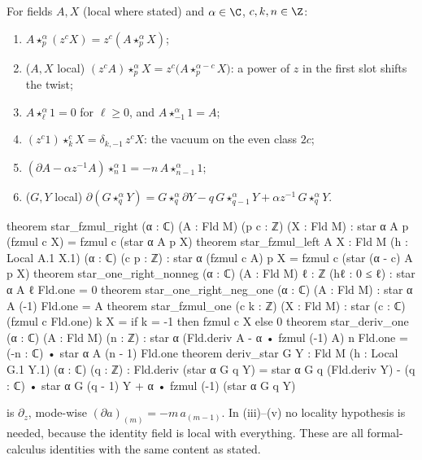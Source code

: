 \begin{proposition}\label{ch07:prop:staraux}
For fields $A, X$ (local where stated) and $\alpha\in\C$, $c,k,n\in\Z$:
\begin{enumerate}[label=(\roman*)]
  \item $A\star^\alpha_p(z^cX) = z^c(A\star^\alpha_pX)$;
  \item ($A,X$ local) $(z^cA)\star^\alpha_pX = z^c\bigl(A\star^{\alpha-c}_pX\bigr)$: a power of $z$
  in the first slot shifts the twist;
  \item $A\star^\alpha_\ell 1 = 0$ for $\ell\ge0$, and $A\star^\alpha_{-1}1 = A$;
  \item $(z^c1)\star^{c}_kX = \delta_{k,-1}\,z^cX$: the vacuum on the even class $2c$;
  \item $(\partial A-\alpha z^{-1}A)\star^\alpha_n1 = -n\,A\star^\alpha_{n-1}1$;
  \item ($G,Y$ local) $\partial(G\star^\alpha_qY) = G\star^\alpha_q\partial Y -
  q\,G\star^\alpha_{q-1}Y + \alpha z^{-1}\,G\star^\alpha_qY$.
\end{enumerate}
\end{proposition}

\begin{leancode}
theorem star_fzmul_right (α : ℂ) (A : Fld M) (p c : ℤ) (X : Fld M) :
    star α A p (fzmul c X) = fzmul c (star α A p X)
theorem star_fzmul_left {A X : Fld M} (h : Local A.1 X.1) (α : ℂ) (c p : ℤ) :
    star α (fzmul c A) p X = fzmul c (star (α - c) A p X)
theorem star_one_right_nonneg (α : ℂ) (A : Fld M) {ℓ : ℤ} (hℓ : 0 ≤ ℓ) :
    star α A ℓ Fld.one = 0
theorem star_one_right_neg_one (α : ℂ) (A : Fld M) : star α A (-1) Fld.one = A
theorem star_fzmul_one (c k : ℤ) (X : Fld M) :
    star (c : ℂ) (fzmul c Fld.one) k X = if k = -1 then fzmul c X else 0
theorem star_deriv_one (α : ℂ) (A : Fld M) (n : ℤ) :
    star α (Fld.deriv A - α • fzmul (-1) A) n Fld.one
      = (-n : ℂ) • star α A (n - 1) Fld.one
theorem deriv_star {G Y : Fld M} (h : Local G.1 Y.1) (α : ℂ) (q : ℤ) :
    Fld.deriv (star α G q Y)
      = star α G q (Fld.deriv Y) - (q : ℂ) • star α G (q - 1) Y
        + α • fzmul (-1) (star α G q Y)
\end{leancode}

\begin{dictionary}
 is $\partial_z$, mode-wise $(\partial a)_{(m)} = -m\,a_{(m-1)}$. In (iii)--(v)
no locality hypothesis is needed, because the identity field is local with everything. These
are all formal-calculus identities with the same content as stated.
\end{dictionary}

